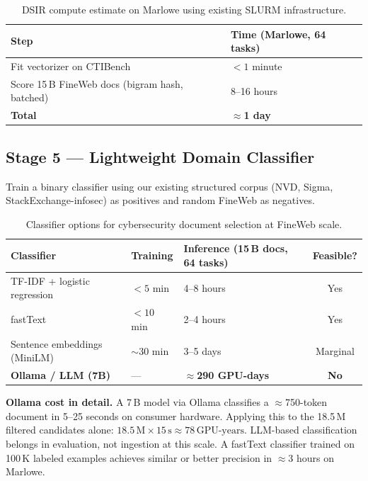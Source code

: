 \documentclass[11pt]{article}
\begin{document}
\begin{table}[h]
\centering
\begin{tabular}{ll}
\toprule
\textbf{Step} & \textbf{Time (Marlowe, 64 tasks)} \\
\midrule
Fit vectorizer on CTIBench          & $<1$ minute \\
Score 15\,B FineWeb docs (bigram hash, batched) & 8--16 hours \\
\midrule
\textbf{Total} & $\approx$\textbf{1 day} \\
\bottomrule
\end{tabular}
\caption{DSIR compute estimate on Marlowe using existing SLURM infrastructure.}
\end{table}

\subsection{Stage 5 --- Lightweight Domain Classifier}

Train a binary classifier using our existing structured corpus (NVD, Sigma,
StackExchange-infosec) as positives and random FineWeb as negatives.

\begin{table}[h]
\centering
\begin{tabular}{lllc}
\toprule
\textbf{Classifier} & \textbf{Training} & \textbf{Inference (15\,B docs, 64 tasks)} & \textbf{Feasible?} \\
\midrule
TF-IDF + logistic regression & $<5$ min   & 4--8 hours   & Yes \\
fastText                     & $<10$ min  & 2--4 hours   & Yes \\
Sentence embeddings (MiniLM) & $\sim$30 min & 3--5 days  & Marginal \\
\textbf{Ollama / LLM (7B)}   & ---        & $\approx$\textbf{290 GPU-days} & \textbf{No} \\
\bottomrule
\end{tabular}
\caption{Classifier options for cybersecurity document selection at FineWeb scale.}
\end{table}

\textbf{Ollama cost in detail.}
A 7\,B model via Ollama classifies a $\approx$750-token document in 5--25 seconds
on consumer hardware. Applying this to the 18.5\,M filtered candidates alone:
$18.5\,\text{M} \times 15\,\text{s} \approx 78\,\text{GPU-years}$.
LLM-based classification belongs in evaluation, not ingestion at this scale.
A fastText classifier trained on 100\,K labeled examples achieves similar or
better precision in $\approx$3 hours on Marlowe.
\end{document}
